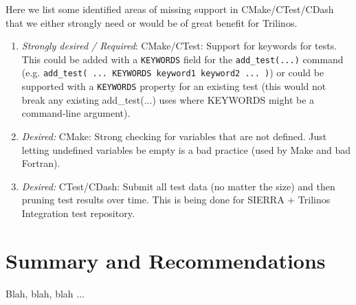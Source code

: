 \documentclass[pdf,ps2pdf,11pt]{SANDreport}
\begin{document}
Here we list some identified areas of missing support in
CMake/CTest/CDash that we either strongly need or would be of great
benefit for Trilinos.

\begin{enumerate}

{}\item\textit{Strongly desired / Required}: CMake/CTest: Support for
keywords for tests.  This could be added with a {}\texttt{KEYWORDS}
field for the {}\texttt{add\_test(...)} command
(e.g. {}\texttt{add\_test( ... KEYWORDS keyword1 keyword2 ... )}) or
could be supported with a {}\texttt{KEYWORDS} property for an existing
test (this would not break any existing add\_test(...) uses where
KEYWORDS might be a command-line argument).

{}\item\textit{Desired:} CMake: Strong checking for variables that are
not defined.  Just letting undefined variables be empty is a bad
practice (used by Make and bad Fortran).

{}\item\textit{Desired:} CTest/CDash: Submit all test data (no matter
the size) and then pruning test results over time.  This is being done
for SIERRA + Trilinos Integration test repository.

\end{enumerate}


%
\section{Summary and Recommendations}
%

Blah, blah, blah ...


%
\clearpage




\begin{SANDdistribution}[NM]
\end{SANDdistribution}
\end{document}
